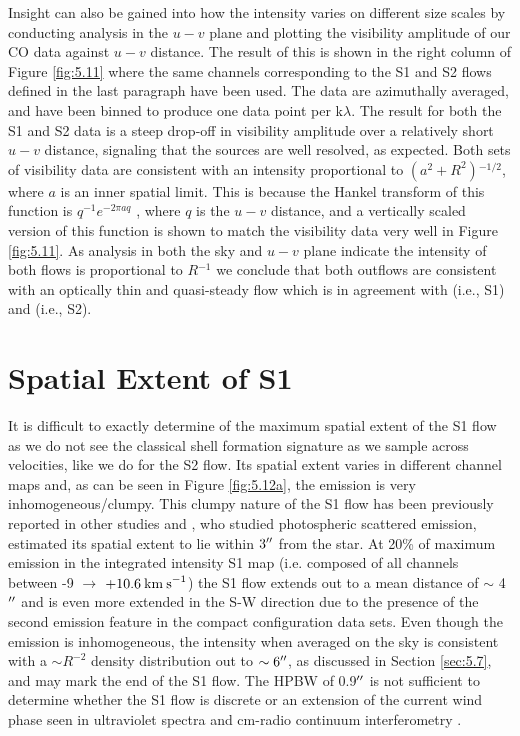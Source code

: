 Insight can also be gained into how the intensity varies on different size scales by conducting analysis in the $u-v$ plane and plotting the visibility amplitude of our CO data against $u-v$ distance. The result of this is shown in the right column of Figure \ref{fig:5.11} where the same channels corresponding to the S1 and S2 flows defined in the last paragraph have been used. The data are azimuthally averaged, and have been binned to produce one data point per k$\lambda$. The result for both the S1 and S2 data is a steep drop-off in visibility amplitude over a relatively short $u-v$ distance, signaling that the sources are well resolved, as expected. Both sets of visibility data are consistent with an intensity proportional to $(a^2 + R^2){}^{-1/2}$, where $a$ is an inner spatial limit. This is because the Hankel transform of this function is $q^{-1}e^{-2\pi aq}$ \citep{bracewell_2000}, where $q$ is the $u-v$ distance, and a vertically scaled version of this function is shown to match the visibility data very well in Figure \ref{fig:5.11}. As analysis in both the sky and $u-v$ plane indicate the intensity of both flows is proportional to $R{}^{-1}$ we conclude that both outflows are  consistent with an optically thin and quasi-steady flow which is in agreement with \cite{smith_2009} (i.e., S1) and \cite{plez_2002} (i.e., S2). 

\section{Spatial Extent of S1}\label{sec:5.8}
It is difficult to exactly determine of the maximum spatial extent of the S1 flow  as we do not see the classical shell formation signature as we sample across velocities, like we do for the S2 flow. Its spatial extent varies in different channel maps and, as can be seen in Figure \ref{fig:5.12a}, the emission is very inhomogeneous/clumpy. This clumpy nature of the S1 flow has been previously reported in other studies \citep{kervella_2011,smith_2009} and \cite{smith_2009}, who studied photospheric scattered emission, estimated its spatial extent to lie within $3^{\prime\prime}$ from the star. At 20\% of maximum emission in the integrated intensity S1 map (i.e. composed of all channels between -9 $\rightarrow$ $+10.6\>{\rm km\>s}^{-1}$) the S1 flow extends out to a mean distance of $\sim$ 4$^{\prime\prime}$ and is even more extended in the S-W direction due to the presence of the second emission feature in the compact configuration data sets. Even though the emission is inhomogeneous, the intensity when averaged on the sky is consistent with a $\sim R^{-2}$ density distribution out to $\sim 6^{\prime\prime}$, as discussed in Section \ref{sec:5.7}, and may mark the end of the S1 flow. The HPBW of 0.9$^{\prime\prime}$ is not sufficient to determine whether the S1 flow is discrete or an extension of the current wind phase seen in ultraviolet spectra \citep[e.g.,][]{carpenter_1997} and cm-radio continuum interferometry \citep{lim_1998}.

